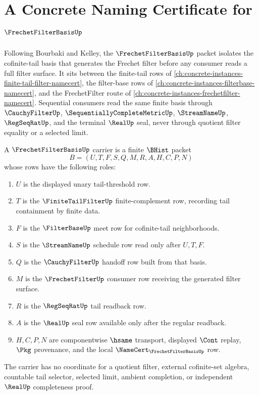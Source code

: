 \chapter{A Concrete Naming Certificate for $\FrechetFilterBasisUp$}
\label{ch:concrete-instances-frechet-filter-basis-namecert}

Following Bourbaki and Kelley, the $\FrechetFilterBasisUp$ packet isolates the cofinite-tail basis that generates the Frechet filter before any consumer reads a full filter surface. It sits between the finite-tail rows of \autoref{ch:concrete-instances-finite-tail-filter-namecert}, the filter-base rows of \autoref{ch:concrete-instances-filterbase-namecert}, and the FrechetFilter route of \autoref{ch:concrete-instances-frechetfilter-namecert}. Sequential consumers read the same finite basis through $\CauchyFilterUp$, $\SequentiallyCompleteMetricUp$, $\StreamNameUp$, $\RegSeqRatUp$, and the terminal $\RealUp$ seal, never through quotient filter equality or a selected limit.

\begin{definition}
\label{def:frechet-filter-basis-carrier}
A $\FrechetFilterBasisUp$ carrier is a finite $\BHist$ packet
$$
B=(U,T,F,S,Q,M,R,A,H,C,P,N)
$$
whose rows have the following roles:
\begin{enumerate}
\item $U$ is the displayed unary tail-threshold row.
\item $T$ is the $\FiniteTailFilterUp$ finite-complement row, recording tail containment by finite data.
\item $F$ is the $\FilterBaseUp$ meet row for cofinite-tail neighborhoods.
\item $S$ is the $\StreamNameUp$ schedule row read only after $U,T,F$.
\item $Q$ is the $\CauchyFilterUp$ handoff row built from that basis.
\item $M$ is the $\FrechetFilterUp$ consumer row receiving the generated filter surface.
\item $R$ is the $\RegSeqRatUp$ tail readback row.
\item $A$ is the $\RealUp$ seal row available only after the regular readback.
\item $H,C,P,N$ are componentwise $\hsame$ transport, displayed $\Cont$ replay, $\Pkg$ provenance, and the local $\NameCert_{\FrechetFilterBasisUp}$ row.
\end{enumerate}
The carrier has no coordinate for a quotient filter, external cofinite-set algebra, countable tail selector, selected limit, ambient completion, or independent $\RealUp$ completeness proof.
\end{definition}

